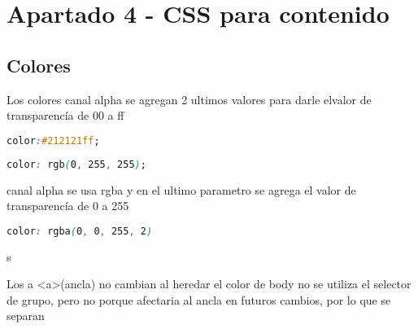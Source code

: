 \section{Apartado 4 - CSS para contenido}

\subsection{Colores}

Los colores canal alpha se agregan 2 ultimos valores para darle elvalor de transparencía de  00 a ff
\begin{lstlisting}[caption={Colores en css con hexadecimal},label={css: colores-hexadecimal},language=css]
    color:#212121ff;
\end{lstlisting}

\begin{lstlisting}[caption={Colores en css con hexadecimal},label={css: colores-rgb},language=css]
    color: rgb(0, 255, 255);
\end{lstlisting}


canal alpha se usa rgba y en el ultimo parametro se agrega 
el valor de transparencía de 0 a 255
\begin{lstlisting}[caption={Colores en css con hexadecimal},label={css: colores-rgba},language=css]
    color: rgba(0, 0, 255, 2)
\end{lstlisting}
s

Los a <a>(ancla) no cambian al heredar el color de body 
no se utiliza el selector de grupo, pero no porque afectaria 
al ancla en futuros cambios, por lo que se separan
